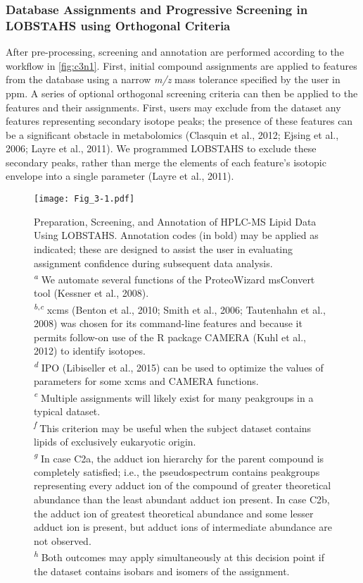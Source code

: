 \subsubsection{Database Assignments and Progressive Screening in LOBSTAHS using Orthogonal Criteria}

After pre-processing, screening and annotation are performed according to the workflow in \autoref{fig:c3n1}. First, initial compound assignments are applied to features from the database using a narrow \emph{m/z} mass tolerance specified by the user in ppm. A series of optional orthogonal screening criteria can then be applied to the features and their assignments. First, users may exclude from the dataset any features representing secondary isotope peaks; the presence of these features can be a significant obstacle in metabolomics (Clasquin et al., 2012; Ejsing et al., 2006; Layre et al., 2011). We programmed LOBSTAHS to exclude these secondary peaks, rather than merge the elements of each feature's isotopic envelope into a single parameter (Layre et al., 2011).

\begin{figure}[!p]
\centering
\texttt{[image: Fig\_3-1.pdf]}
\caption[Preparation, Screening, and Annotation of HPLC-MS Lipid Data Using LOBSTAHS]{Preparation, Screening, and Annotation of HPLC-MS Lipid Data Using LOBSTAHS. Annotation codes (in bold) may be applied as indicated; these are designed to assist the user in evaluating assignment confidence during subsequent data analysis.\\
\emph{\textsuperscript{a}} We automate several functions of the ProteoWizard msConvert tool (Kessner et al., 2008).\\
\textsuperscript{\emph{b},\emph{c}} xcms (Benton et al., 2010; Smith et al., 2006; Tautenhahn et al., 2008) was chosen for its command-line features and because it permits follow-on use of the R package CAMERA (Kuhl et al., 2012) to identify isotopes.\\
\emph{\textsuperscript{d}} IPO (Libiseller et al., 2015) can be used to optimize the values of parameters for some xcms and CAMERA functions.\\
\emph{\textsuperscript{e}} Multiple assignments will likely exist for many peakgroups in a typical dataset.\\
\emph{\textsuperscript{f}} This criterion may be useful when the subject dataset contains lipids of exclusively eukaryotic origin.\\
\emph{\textsuperscript{g}} In case C2a, the adduct ion hierarchy for the parent compound is completely satisfied; i.e., the pseudospectrum contains peakgroups representing every adduct ion of the compound of greater theoretical abundance than the least abundant adduct ion present. In case C2b, the adduct ion of greatest theoretical abundance and some lesser adduct ion is present, but adduct ions of intermediate abundance are not observed.\\
\textsuperscript{\emph{h}} Both outcomes may apply simultaneously at this decision point if the dataset contains isobars and isomers of the assignment.}
\label{fig:c3n1}
\end{figure}

